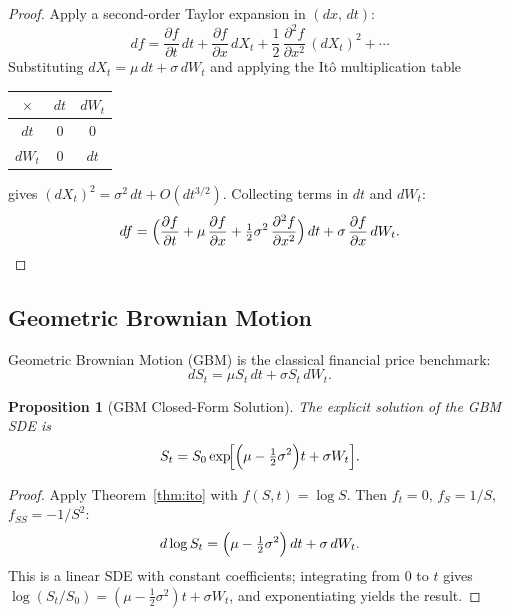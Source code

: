 \documentclass[11pt,a4paper]{article}
\theoremstyle{plain}
\newtheorem{proposition}[theorem]{Proposition}
\theoremstyle{definition}
\newcommand{\sig}{\sigma}
\begin{document}
\begin{proof}
Apply a second-order Taylor expansion in $(dx,\,dt)$:
\[
  df = \frac{\partial f}{\partial t}\,dt
     + \frac{\partial f}{\partial x}\,dX_t
     + \frac{1}{2}\,\frac{\partial^2 f}{\partial x^2}\,(dX_t)^2 + \cdots
\]
Substituting $dX_t = \mu\,dt + \sig\,dW_t$ and applying the It\^{o}
multiplication table
\begin{center}
\begin{tabular}{c|cc}
  $\times$ & $dt$ & $dW_t$ \\ \hline
  $dt$     & $0$  & $0$    \\
  $dW_t$   & $0$  & $dt$   \\
\end{tabular}
\end{center}
gives $(dX_t)^2 = \sig^2\,dt + O(dt^{3/2})$.  Collecting terms in $dt$ and $dW_t$:
\[
  df = \Bigl(
         \frac{\partial f}{\partial t}
       + \mu\,\frac{\partial f}{\partial x}
       + \tfrac{1}{2}\sig^2\,\frac{\partial^2 f}{\partial x^2}
       \Bigr)\,dt
     + \sig\,\frac{\partial f}{\partial x}\,dW_t. \qedhere
\]
\end{proof}

\subsection{Geometric Brownian Motion}

Geometric Brownian Motion (GBM) is the classical financial price benchmark:
\begin{equation}
  dS_t = \mu S_t\,dt + \sig S_t\,dW_t.
\end{equation}

\begin{proposition}[GBM Closed-Form Solution]\label{prop:gbm}
The explicit solution of the GBM SDE is
\begin{equation}
  S_t = S_0\exp\!\Bigl[\Bigl(\mu - \tfrac{1}{2}\sig^2\Bigr)t + \sig W_t\Bigr].
\end{equation}
\end{proposition}

\begin{proof}
Apply Theorem~\ref{thm:ito} with $f(S,t) = \log S$.  Then $f_t = 0$,
$f_S = 1/S$, $f_{SS} = -1/S^2$:
\[
  d\log S_t = \Bigl(\mu - \tfrac{1}{2}\sig^2\Bigr)\,dt + \sig\,dW_t.
\]
This is a linear SDE with constant coefficients; integrating from $0$ to $t$
gives $\log(S_t/S_0) = (\mu - \tfrac{1}{2}\sig^2)t + \sig W_t$,
and exponentiating yields the result.
\end{proof}
\end{document}
